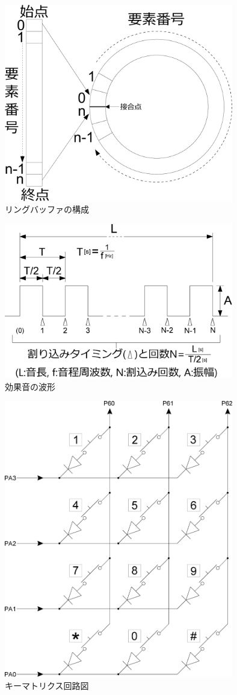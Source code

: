 ﻿\documentclass{jarticle}
\begin{document}
\begin{figure}{}
	\begin{center}
		\includegraphics[width=10cm]{./figure3.eps}
	\end{center}
	\caption{リングバッファの構成}
\end{figure}

\begin{figure}{}
	\begin{center}
		\includegraphics[width=10cm]{./figure4.eps}
	\end{center}
	\caption{効果音の波形}
\end{figure}

\begin{figure}{}
	\begin{center}
		\includegraphics[width=10cm]{./figure5.eps}
	\end{center}
	\caption{キーマトリクス回路図}
\end{figure}
\end{document}
